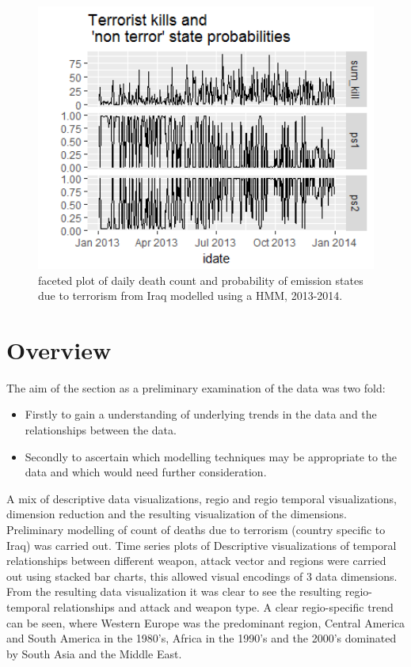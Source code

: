 \begin{figure}[t]
\includegraphics[width=15cm]{Peters_experiment_markdown_files/figure-latex/Rplot02_2013_2014.png}
\caption{faceted plot of daily death count and probability of emission states due to terrorism from Iraq modelled using a HMM, 2013-2014.}
\label{fig:Rplot02_2013_2014_HMM}
\centering
\end{figure}

\section{Overview}

The aim of the section as a preliminary examination of the data was two fold:
\begin{itemize}
\item Firstly to gain a understanding of underlying trends in the data and the relationships between the data.
\item Secondly to ascertain which modelling techniques may be appropriate to the data and which would need further consideration.
\end{itemize}
A mix of descriptive data visualizations, regio and regio temporal visualizations, dimension reduction and the resulting visualization of the dimensions. Preliminary modelling of count  of deaths due to terrorism (country specific to Iraq) was carried out.
Time series plots of Descriptive visualizations of temporal relationships between different weapon, attack vector and regions were carried out using stacked bar charts, this allowed visual encodings  of 3 data dimensions. From the resulting data visualization it was clear to see the resulting regio-temporal relationships  and  attack and weapon type. A clear regio-specific trend can be seen, where Western Europe was the predominant region, Central America and South America in the 1980's, Africa in the 1990's and the 2000's dominated by South Asia and the Middle East. 


